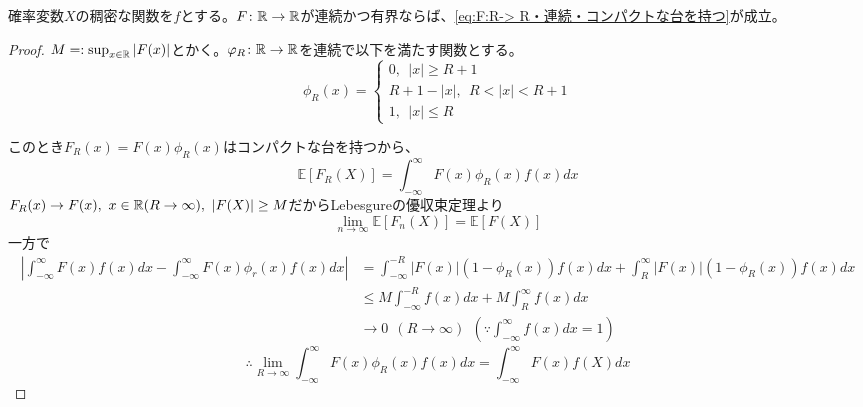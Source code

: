 \documentclass[dvipdfmx, leqno]{jsbook}
\begin{document}
\begin{souprop}
    確率変数$X$の稠密な関数を$f$とする。$F\colon \mathbb{R}\to \mathbb{R}$が連続かつ有界ならば、\eqref{eq:F:R-> R・連続・コンパクトな台を持つ}が成立。 
\end{souprop}
\begin{proof}
    $M=:\sup_{x\in \mathbb{R}} |F(x)|$とかく。$\varphi_R\colon \mathbb{R}\to \mathbb{R}$を連続で以下を満たす関数とする。
\begin{equation}
    \phi_R(x) 
    = 
\begin{cases}
    0,\ \ |x|\ge R+ 1\\
    R+ 1- |x|,\ \ R< |x|< R+ 1\\
    1,\ \ |x|\le R
\end{cases}
\end{equation}
\begin{tikzpicture}
\end{tikzpicture}
    このとき$F_R(x)= F(x)\phi_R(x)$はコンパクトな台を持つから、
\begin{equation}
    \mathbb{E}[F_R(X)]= \int_{-\infty}^\infty F(x)\phi_R(x)f(x)dx
\end{equation}
    $F_R(x)\to F(x),\ x\in \R(R\to \infty),\ |F(X)|\ge M$だからLebesgureの優収束定理より
\begin{equation}
    \lim_{n\to \infty}\mathbb{E}[F_n(X)]= \mathbb{E}[F(X)]
\end{equation}
    一方で
\begin{align}
    \left|\int_{-\infty}^\infty F(x)f(x)dx- \int_{-\infty}^\infty F(x)\phi_r(x)f(x)dx\right|
    &= \int_{-\infty}^{-R}|F(x)|(1- \phi_R(x))f(x)dx+ \int_R^\infty |F(x)|(1- \phi_R(x))f(x)dx\\
    &\le M\int_{-\infty}^{-R} f(x)dx+ M\int_R^\infty f(x)dx\\
    &\to 0\ \ (R\to \infty)\ \ \left(\because \int_{-\infty}^\infty f(x)dx= 1\right)
\end{align}
\begin{equation}
    \therefore \lim_{R\to \infty}\int_{-\infty}^\infty F(x)\phi_R(x)f(x)dx= \int_{-\infty}^\infty F(x)f(X)dx
\end{equation}
\end{proof}
\end{document}
